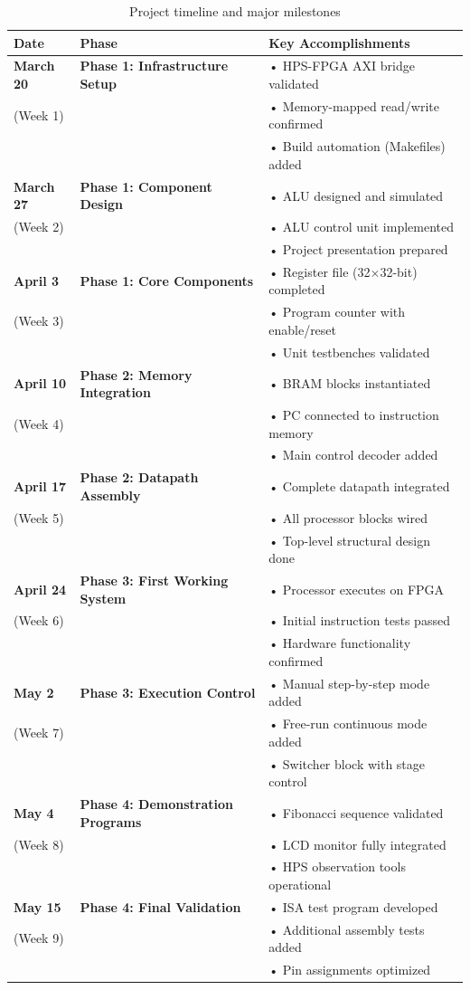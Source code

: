 \documentclass[a4paper,11pt]{scrartcl}
\begin{document}
\begin{table}[htbp]
\caption{\label{tab:timeline}Project timeline and major milestones}
\centering
\begin{tabular}{lll}
\hline
Date & Phase & Key Accomplishments\\
\hline
\textbf{March 20} & \textbf{Phase 1: Infrastructure Setup} & • HPS-FPGA AXI bridge validated\\
(Week 1) &  & • Memory-mapped read/write confirmed\\
 &  & • Build automation (Makefiles) added\\
\hline
\textbf{March 27} & \textbf{Phase 1: Component Design} & • ALU designed and simulated\\
(Week 2) &  & • ALU control unit implemented\\
 &  & • Project presentation prepared\\
\hline
\textbf{April 3} & \textbf{Phase 1: Core Components} & • Register file (32×32-bit) completed\\
(Week 3) &  & • Program counter with enable/reset\\
 &  & • Unit testbenches validated\\
\hline
\textbf{April 10} & \textbf{Phase 2: Memory Integration} & • BRAM blocks instantiated\\
(Week 4) &  & • PC connected to instruction memory\\
 &  & • Main control decoder added\\
\hline
\textbf{April 17} & \textbf{Phase 2: Datapath Assembly} & • Complete datapath integrated\\
(Week 5) &  & • All processor blocks wired\\
 &  & • Top-level structural design done\\
\hline
\textbf{April 24} & \textbf{Phase 3: First Working System} & • Processor executes on FPGA\\
(Week 6) &  & • Initial instruction tests passed\\
 &  & • Hardware functionality confirmed\\
\hline
\textbf{May 2} & \textbf{Phase 3: Execution Control} & • Manual step-by-step mode added\\
(Week 7) &  & • Free-run continuous mode added\\
 &  & • Switcher block with stage control\\
\hline
\textbf{May 4} & \textbf{Phase 4: Demonstration Programs} & • Fibonacci sequence validated\\
(Week 8) &  & • LCD monitor fully integrated\\
 &  & • HPS observation tools operational\\
\hline
\textbf{May 15} & \textbf{Phase 4: Final Validation} & • ISA test program developed\\
(Week 9) &  & • Additional assembly tests added\\
 &  & • Pin assignments optimized\\
\hline
\end{tabular}
\end{table}
\end{document}
